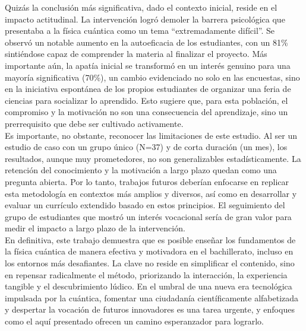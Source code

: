 \documentclass[10pt,a4paper]{article}
\begin{document}
\vspace{1em}
Quizás la conclusión más significativa, dado el contexto inicial, reside en el impacto actitudinal. La intervención logró demoler la barrera psicológica que presentaba a la física cuántica como un tema ``extremadamente difícil''. Se observó un notable aumento en la autoeficacia de los estudiantes, con un 81\% sintiéndose capaz de comprender la materia al finalizar el proyecto. Más importante aún, la apatía inicial se transformó en un interés genuino para una mayoría significativa (70\%), un cambio evidenciado no solo en las encuestas, sino en la iniciativa espontánea de los propios estudiantes de organizar una feria de ciencias para socializar lo aprendido. Esto sugiere que, para esta población, el compromiso y la motivación no son una consecuencia del aprendizaje, sino un prerrequisito que debe ser cultivado activamente.\\
\vspace{1em}
Es importante, no obstante, reconocer las limitaciones de este estudio. Al ser un estudio de caso con un grupo único (N=37) y de corta duración (un mes), los resultados, aunque muy prometedores, no son generalizables estadísticamente. La retención del conocimiento y la motivación a largo plazo quedan como una pregunta abierta. Por lo tanto, trabajos futuros deberían enfocarse en replicar esta metodología en contextos más amplios y diversos, así como en desarrollar y evaluar un currículo extendido basado en estos principios. El seguimiento del grupo de estudiantes que mostró un interés vocacional sería de gran valor para medir el impacto a largo plazo de la intervención.\\
\vspace{1em}
En definitiva, este trabajo demuestra que es posible enseñar los fundamentos de la física cuántica de manera efectiva y motivadora en el bachillerato, incluso en los entornos más desafiantes. La clave no reside en simplificar el contenido, sino en repensar radicalmente el método, priorizando la interacción, la experiencia tangible y el descubrimiento lúdico. En el umbral de una nueva era tecnológica impulsada por la cuántica, fomentar una ciudadanía científicamente alfabetizada y despertar la vocación de futuros innovadores es una tarea urgente, y enfoques como el aquí presentado ofrecen un camino esperanzador para lograrlo.


\printbibliography
\end{document}
